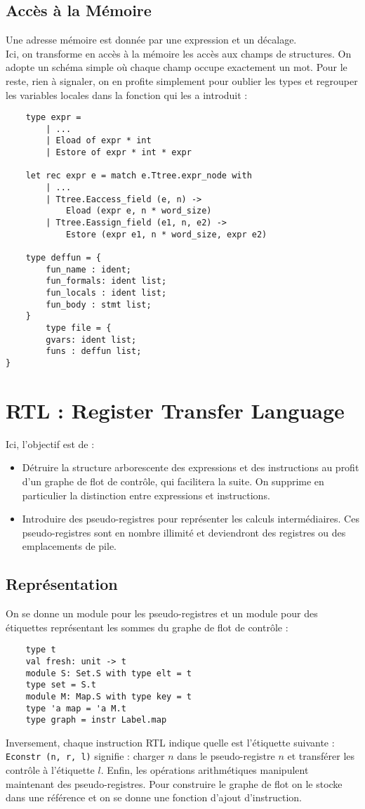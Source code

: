 \documentclass{cours}
\begin{document}
\subsection{Accès à la Mémoire}
Une adresse mémoire est donnée par une expression et un décalage.\\
Ici, on transforme en accès à la mémoire les accès aux champs de structures. On adopte un schéma simple où chaque champ occupe exactement un mot. Pour le reste, rien à signaler, on en profite simplement pour oublier les types et regrouper les variables locales dans la fonction qui les a introduit :
\begin{verbatim}
    type expr =
        | ...
        | Eload of expr * int
        | Estore of expr * int * expr

    let rec expr e = match e.Ttree.expr_node with
        | ...
        | Ttree.Eaccess_field (e, n) ->
            Eload (expr e, n * word_size)
        | Ttree.Eassign_field (e1, n, e2) ->
            Estore (expr e1, n * word_size, expr e2)

    type deffun = {
        fun_name : ident;
        fun_formals: ident list;
        fun_locals : ident list;
        fun_body : stmt list;
    }
        type file = {
        gvars: ident list;
        funs : deffun list;
}
\end{verbatim}

\section{RTL : Register Transfer Language}
Ici, l'objectif est de :
\begin{itemize}
    \item Détruire la structure arborescente des expressions et des instructions au profit d'un graphe de flot de contrôle, qui facilitera la suite. On supprime en particulier la distinction entre expressions et instructions.
    \item Introduire des pseudo-registres pour représenter les calculs intermédiaires. Ces pseudo-registres sont en nombre illimité et deviendront des registres ou des emplacements de pile.
\end{itemize}
\subsection{Représentation}
On se donne un module pour les pseudo-registres et un module pour des étiquettes représentant les sommes du graphe de flot de contrôle :
\begin{verbatim}
    type t
    val fresh: unit -> t
    module S: Set.S with type elt = t
    type set = S.t
    module M: Map.S with type key = t
    type 'a map = 'a M.t
    type graph = instr Label.map

\end{verbatim}
Inversement, chaque instruction RTL indique quelle est l'étiquette suivante : \texttt{Econstr (n, r, l)} signifie : charger $n$ dans le pseudo-registre $n$ et transférer les contrôle à l'étiquette $l$. Enfin, les opérations arithmétiques manipulent maintenant des pseudo-registres. Pour construire le graphe de flot on le stocke dans une référence et on se donne une fonction d'ajout d'instruction.
\end{document}
